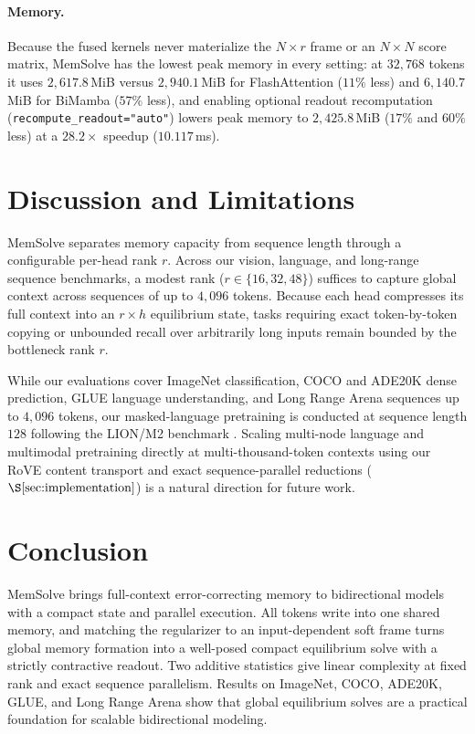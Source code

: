 \documentclass[10pt,twocolumn]{article}
\begin{document}
\paragraph{Memory.}
Because the fused kernels never materialize the $N\times r$ frame or an
$N\times N$ score matrix, MemSolve has the lowest peak memory in every setting:
at $32{,}768$ tokens it uses $2{,}617.8$\,MiB versus $2{,}940.1$\,MiB for
FlashAttention ($11\%$ less) and $6{,}140.7$\,MiB for BiMamba ($57\%$ less),
and enabling optional readout recomputation (\texttt{recompute\_readout="auto"})
lowers peak memory to $2{,}425.8$\,MiB ($17\%$ and $60\%$ less) at a
$28.2\times$ speedup ($10.117$\,ms).

\section{Discussion and Limitations}

MemSolve separates memory capacity from sequence length through a configurable
per-head rank $r$.
Across our vision, language, and long-range sequence benchmarks, a modest rank
($r\in\{16,32,48\}$) suffices to capture global context across sequences of up
to $4{,}096$ tokens.
Because each head compresses its full context into an $r\times h$ equilibrium
state, tasks requiring exact token-by-token copying or unbounded recall over
arbitrarily long inputs remain bounded by the bottleneck rank $r$.

While our evaluations cover ImageNet classification, COCO and ADE20K dense
prediction, GLUE language understanding, and Long Range Arena sequences up to
$4{,}096$ tokens, our masked-language pretraining is conducted at sequence
length $128$ following the LION/M2 benchmark
\cite{fu2023monarch,afzal2025lion}.
Scaling multi-node language and multimodal pretraining directly at
multi-thousand-token contexts using our RoVE content transport and exact
sequence-parallel reductions ($\S\ref{sec:implementation}$) is a natural
direction for future work.

\section{Conclusion}

MemSolve brings full-context error-correcting memory to bidirectional models
with a compact state and parallel execution.
All tokens write into one shared memory, and matching the regularizer to an
input-dependent soft frame turns global memory formation into a well-posed
compact equilibrium solve with a strictly contractive readout.
Two additive statistics give linear complexity at fixed rank and exact
sequence parallelism.
Results on ImageNet, COCO, ADE20K, GLUE, and Long Range Arena show that global
equilibrium solves are a practical foundation for scalable bidirectional
modeling.
\end{document}
